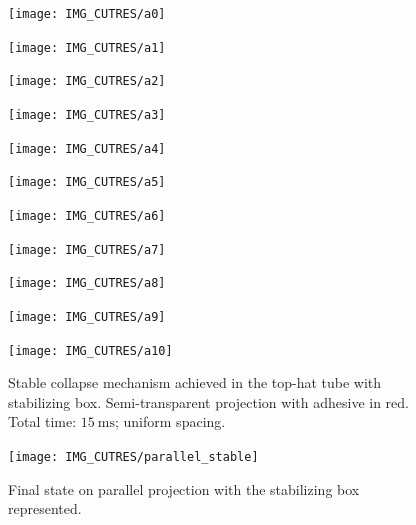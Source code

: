 \documentclass[cmfonts]{witpress}
\begin{document}
\begin{figure}
	\centering
	\begin{minipage}[b]{.06\linewidth}
		\centering
		\texttt{[image: IMG\_CUTRES/a0]}
	\end{minipage}
	\quad
	\begin{minipage}[b]{.06\linewidth}
		\centering
		\texttt{[image: IMG\_CUTRES/a1]}
	\end{minipage}
	\quad
	\begin{minipage}[b]{.06\linewidth}
		\centering
		\texttt{[image: IMG\_CUTRES/a2]}
	\end{minipage}
	\quad
	\begin{minipage}[b]{.06\linewidth}
		\centering
		\texttt{[image: IMG\_CUTRES/a3]}
	\end{minipage}
	\quad
	\begin{minipage}[b]{.06\linewidth}
		\centering
		\texttt{[image: IMG\_CUTRES/a4]}
	\end{minipage}
	\quad
	\begin{minipage}[b]{.06\linewidth}
		\centering
		\texttt{[image: IMG\_CUTRES/a5]}
	\end{minipage}
	\quad
	\begin{minipage}[b]{.06\linewidth}
		\centering
		\texttt{[image: IMG\_CUTRES/a6]}
	\end{minipage}
	\quad
	\begin{minipage}[b]{.06\linewidth}
		\centering
		\texttt{[image: IMG\_CUTRES/a7]}
	\end{minipage}
	\quad
	\begin{minipage}[b]{.06\linewidth}
		\centering
		\texttt{[image: IMG\_CUTRES/a8]}
	\end{minipage}
	\quad
	\begin{minipage}[b]{.06\linewidth}
		\centering
		\texttt{[image: IMG\_CUTRES/a9]}
	\end{minipage}
	\quad
	\begin{minipage}[b]{.06\linewidth}
		\centering
		\texttt{[image: IMG\_CUTRES/a10]}
	\end{minipage}
	\caption[Stable collapse mechanism achieved in the top-hat tube with stabilizing box.]{Stable collapse mechanism achieved in the top-hat tube with stabilizing box. Semi-transparent projection with adhesive in red. Total time: $\SI{15}{\ms}$; uniform spacing.}
	\label{fig:stable}
\end{figure}

\begin{figure}
	\centering
	\texttt{[image: IMG\_CUTRES/parallel\_stable]}
	\caption{Final state on parallel projection with the stabilizing box represented.}
	\label{fig:stabil_box}
\end{figure}
\end{document}
